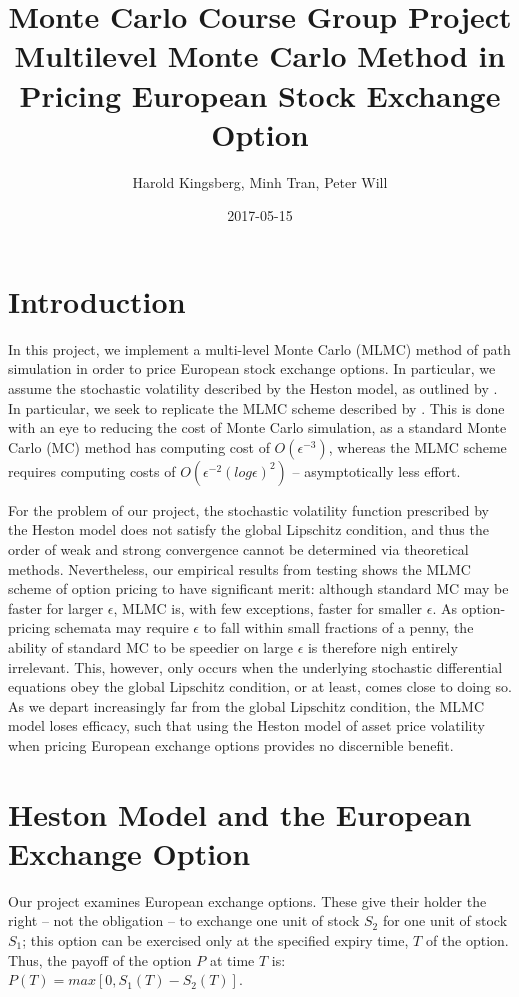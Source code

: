 \documentclass{article}
\title{Monte Carlo Course Group Project \\ 
Multilevel Monte Carlo Method in Pricing European Stock Exchange Option}
\author{Harold Kingsberg, Minh Tran, Peter Will}
\date{2017-05-15}
\begin{document}
\maketitle
\tableofcontents

\newpage
\section{Introduction} 
	In this project, we implement a multi-level Monte Carlo (MLMC) method of path simulation in order to price European stock exchange options. In particular, we assume the stochastic volatility described by the Heston model, as outlined by \cite{heston93}. In particular, we seek to replicate the MLMC scheme described by \cite{giles08}. This is done with an eye to reducing the cost of Monte Carlo simulation, as a standard Monte Carlo (MC) method has computing cost of $O(\epsilon^{-3})$, whereas the MLMC scheme requires computing costs of $O(\epsilon^{-2}(log\epsilon)^2)$ -- asymptotically less effort. 
    
    For the problem of our project, the stochastic volatility function prescribed by the Heston model does not satisfy the global Lipschitz condition, and thus the order of weak and strong convergence cannot be determined \cite{giles08} via theoretical methods. Nevertheless, our empirical results from testing shows the MLMC scheme of option pricing to have significant merit: although standard MC may be faster for larger $\epsilon$, MLMC is, with few exceptions, faster for smaller $\epsilon$. As option-pricing schemata may require $\epsilon$ to fall within small fractions of a penny, the ability of standard MC to be speedier on large $\epsilon$ is therefore nigh entirely irrelevant. This, however, only occurs when the underlying stochastic differential equations obey the global Lipschitz condition, or at least, comes close to doing so. As we depart increasingly far from the global Lipschitz condition, the MLMC model loses efficacy, such that using the Heston model of asset price volatility when pricing European exchange options provides no discernible benefit.

\section{Heston Model and the European Exchange Option}
	Our project examines European exchange options. These give their holder the right -- not the obligation -- to exchange one unit of stock $S_2$ for one unit of stock $S_1$; this option can be exercised only at the specified expiry time, $T$ of the option. Thus, the payoff of the option $P$ at time $T$ is: $P(T)=max[0, S_1(T)-S_2(T)]$.
	
\end{document}
